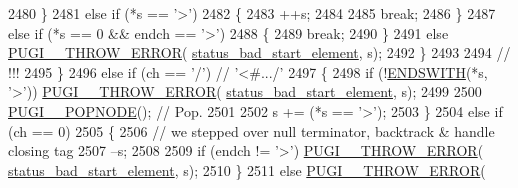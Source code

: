 \begin{DoxyCode}
2480                                 \}
2481                                 \textcolor{keywordflow}{else} \textcolor{keywordflow}{if} (*s == \textcolor{charliteral}{'>'})
2482                                 \{
2483                                     ++s;
2484 
2485                                     \textcolor{keywordflow}{break};
2486                                 \}
2487                                 \textcolor{keywordflow}{else} \textcolor{keywordflow}{if} (*s == 0 && endch == \textcolor{charliteral}{'>'})
2488                                 \{
2489                                     \textcolor{keywordflow}{break};
2490                                 \}
2491                                 \textcolor{keywordflow}{else} \hyperlink{pugixml_8cpp_a8af02d87a10272f03f96ab93a96d7202}{PUGI\_\_THROW\_ERROR}(
      \hyperlink{namespacepugi_a9054ca609e12afb8f3e5892fc6c0b555a3cf4e84a5b433ce50e6f3037df5c1bdd}{status\_bad\_start\_element}, s);
2492                             \}
2493 
2494                             \textcolor{comment}{// !!!}
2495                         \}
2496                         \textcolor{keywordflow}{else} \textcolor{keywordflow}{if} (ch == \textcolor{charliteral}{'/'}) \textcolor{comment}{// '<#.../'}
2497                         \{
2498                             \textcolor{keywordflow}{if} (!\hyperlink{pugixml_8cpp_a3a72d0b2c0e7f99940ce8fbcc69e532f}{ENDSWITH}(*s, \textcolor{charliteral}{'>'})) \hyperlink{pugixml_8cpp_a8af02d87a10272f03f96ab93a96d7202}{PUGI\_\_THROW\_ERROR}(
      \hyperlink{namespacepugi_a9054ca609e12afb8f3e5892fc6c0b555a3cf4e84a5b433ce50e6f3037df5c1bdd}{status\_bad\_start\_element}, s);
2499 
2500                             \hyperlink{pugixml_8cpp_ab82f13ed99cc2d22c5ecb6e18b5dfe17}{PUGI\_\_POPNODE}(); \textcolor{comment}{// Pop.}
2501 
2502                             s += (*s == \textcolor{charliteral}{'>'});
2503                         \}
2504                         \textcolor{keywordflow}{else} \textcolor{keywordflow}{if} (ch == 0)
2505                         \{
2506                             \textcolor{comment}{// we stepped over null terminator, backtrack & handle closing tag}
2507                             --s;
2508                             
2509                             \textcolor{keywordflow}{if} (endch != \textcolor{charliteral}{'>'}) \hyperlink{pugixml_8cpp_a8af02d87a10272f03f96ab93a96d7202}{PUGI\_\_THROW\_ERROR}(
      \hyperlink{namespacepugi_a9054ca609e12afb8f3e5892fc6c0b555a3cf4e84a5b433ce50e6f3037df5c1bdd}{status\_bad\_start\_element}, s);
2510                         \}
2511                         \textcolor{keywordflow}{else} \hyperlink{pugixml_8cpp_a8af02d87a10272f03f96ab93a96d7202}{PUGI\_\_THROW\_ERROR}(

\end{DoxyCode}
